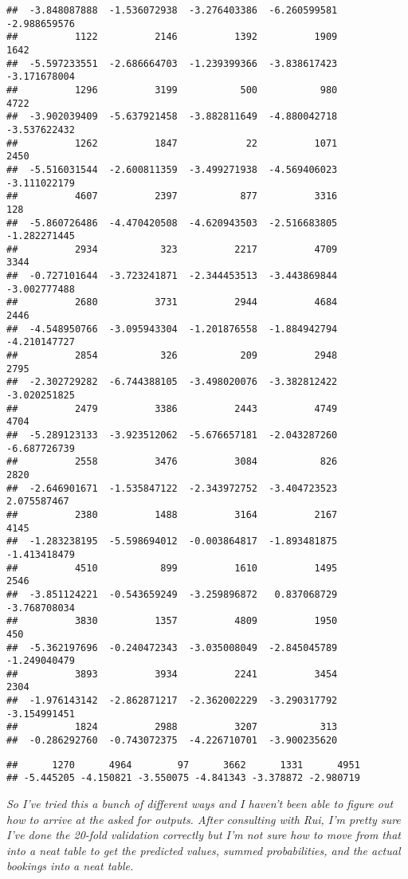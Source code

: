 \documentclass[
]{article}
\begin{document}
\begin{verbatim}
##  -3.848087888  -1.536072938  -3.276403386  -6.260599581  -2.988659576 
##          1122          2146          1392          1909          1642 
##  -5.597233551  -2.686664703  -1.239399366  -3.838617423  -3.171678004 
##          1296          3199           500           980          4722 
##  -3.902039409  -5.637921458  -3.882811649  -4.880042718  -3.537622432 
##          1262          1847            22          1071          2450 
##  -5.516031544  -2.600811359  -3.499271938  -4.569406023  -3.111022179 
##          4607          2397           877          3316           128 
##  -5.860726486  -4.470420508  -4.620943503  -2.516683805  -1.282271445 
##          2934           323          2217          4709          3344 
##  -0.727101644  -3.723241871  -2.344453513  -3.443869844  -3.002777488 
##          2680          3731          2944          4684          2446 
##  -4.548950766  -3.095943304  -1.201876558  -1.884942794  -4.210147727 
##          2854           326           209          2948          2795 
##  -2.302729282  -6.744388105  -3.498020076  -3.382812422  -3.020251825 
##          2479          3386          2443          4749          4704 
##  -5.289123133  -3.923512062  -5.676657181  -2.043287260  -6.687726739 
##          2558          3476          3084           826          2820 
##  -2.646901671  -1.535847122  -2.343972752  -3.404723523   2.075587467 
##          2380          1488          3164          2167          4145 
##  -1.283238195  -5.598694012  -0.003864817  -1.893481875  -1.413418479 
##          4510           899          1610          1495          2546 
##  -3.851124221  -0.543659249  -3.259896872   0.837068729  -3.768708034 
##          3830          1357          4809          1950           450 
##  -5.362197696  -0.240472343  -3.035008049  -2.845045789  -1.249040479 
##          3893          3934          2241          3454          2304 
##  -1.976143142  -2.862871217  -2.362002229  -3.290317792  -3.154991451 
##          1824          2988          3207           313 
##  -0.286292760  -0.743072375  -4.226710701  -3.900235620
\end{verbatim}

\begin{verbatim}
##      1270      4964        97      3662      1331      4951 
## -5.445205 -4.150821 -3.550075 -4.841343 -3.378872 -2.980719
\end{verbatim}

\emph{So I've tried this a bunch of different ways and I haven't been
able to figure out how to arrive at the asked for outputs. After
consulting with Rui, I'm pretty sure I've done the 20-fold validation
correctly but I'm not sure how to move from that into a neat table to
get the predicted values, summed probabilities, and the actual bookings
into a neat table. }
\end{document}
